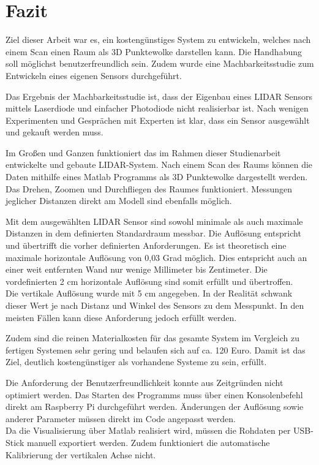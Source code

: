 \chapter{Fazit}\label{chap:fazit}

Ziel dieser Arbeit war es, ein kostengünstiges System zu entwickeln, welches nach einem Scan einen Raum als 3D Punktewolke darstellen kann. Die Handhabung soll möglichst benutzerfreundlich sein. Zudem wurde eine Machbarkeitsstudie zum Entwickeln eines eigenen Sensors durchgeführt.

Das Ergebnis der Machbarkeitsstudie ist, dass der Eigenbau eines \ac{LIDAR} Sensors mittels Laserdiode und einfacher Photodiode nicht realisierbar ist. Nach wenigen Experimenten und Gesprächen mit Experten ist klar, dass ein Sensor ausgewählt und gekauft werden muss.

Im Großen und Ganzen funktioniert das im Rahmen dieser Studienarbeit entwickelte und gebaute \ac{LIDAR}-System. Nach einem Scan des Raums können die Daten mithilfe eines Matlab Programms als 3D Punktewolke dargestellt werden. Das Drehen, Zoomen und Durchfliegen des Raumes funktioniert. Messungen jeglicher Distanzen direkt am Modell sind ebenfalls möglich.

Mit dem ausgewählten \ac{LIDAR} Sensor sind sowohl minimale als auch maximale Distanzen in dem definierten Standardraum messbar. Die Auflösung entspricht und übertrifft die vorher definierten Anforderungen. Es ist theoretisch eine maximale horizontale Auflösung von 0,03 Grad möglich. Dies entspricht auch an einer weit entfernten Wand nur wenige Millimeter bis Zentimeter. Die vordefinierten 2 cm horizontale Auflösung sind somit erfüllt und übertroffen. \\
Die vertikale Auflösung wurde mit 5 cm angegeben. In der Realität schwank dieser Wert je nach Distanz und Winkel des Sensors zu dem Messpunkt. In den meisten Fällen kann diese Anforderung jedoch erfüllt werden. 

Zudem sind die reinen Materialkosten für das gesamte System im Vergleich zu fertigen Systemen sehr gering und belaufen sich auf ca. 120 Euro. Damit ist das Ziel, deutlich kostengünstiger als vorhandene Systeme zu sein, erfüllt.
 
Die Anforderung der Benutzerfreundlichkeit konnte aus Zeitgründen nicht optimiert werden. Das Starten des Programms muss über einen Konsolenbefehl direkt am Raspberry Pi durchgeführt werden. Änderungen der Auflösung sowie anderer Parameter müssen direkt im Code angepasst werden.\\
Da die Visualisierung über Matlab realisiert wird, müssen die Rohdaten per USB-Stick manuell exportiert werden. Zudem funktioniert die automatische Kalibrierung der vertikalen Achse nicht.

